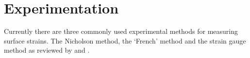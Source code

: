 \section{Experimentation}
Currently there are three commonly used experimental methods for measuring
surface strains. The Nicholson method, the `French' method and the strain
gauge method as reviewed by \cite{Murphy_2005} and \cite{yang2005measurement}.